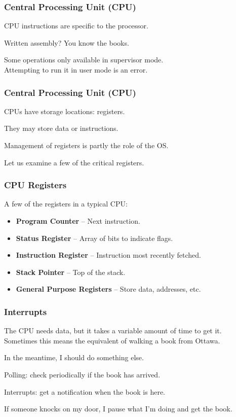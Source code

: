 \begin{frame}
\frametitle{Central Processing Unit (CPU)}
CPU instructions are specific to the processor.

Written assembly? You know the books.

Some operations only available in supervisor mode.\\
\quad Attempting to run it in user mode is an error.


\end{frame}

\begin{frame}
\frametitle{Central Processing Unit (CPU)}
CPUs have storage locations: \alert{registers}.

They may store data or instructions.

Management of registers is partly the role of the OS.

Let us examine a few of the critical registers.

\end{frame}

\begin{frame}
\frametitle{CPU Registers}

A few of the registers in a typical CPU:

\begin{itemize}
	\item \textbf{Program Counter} -- Next instruction.
	\item \textbf{Status Register} -- Array of bits to indicate flags.
	\item \textbf{Instruction Register} -- Instruction most recently fetched.
	\item \textbf{Stack Pointer} -- Top of the stack.
	\item \textbf{General Purpose Registers} -- Store data, addresses, etc.
\end{itemize}


\end{frame}


\begin{frame}
\frametitle{Interrupts}
The CPU needs data, but it takes a variable amount of time to get it.\\
\quad Sometimes this means the equivalent of walking a book from Ottawa.

In the meantime, I should do something else.

Polling: check periodically if the book has arrived.

Interrupts: get a notification when the book is here.

If someone knocks on my door, I pause what I'm doing and get the book.


\end{frame}

